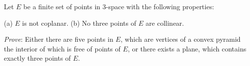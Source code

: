 Let $E$ be a finite set of points in 3-space with the following properties:

(a) $E$ is not coplanar. (b) No three points of $E$ are collinear.

\emph{Prove}: Either there are five points in $E$, which are vertices of a convex pyramid the interior of which is free of points of $E$, or there exists a plane, which contains exactly three points of $E$.
